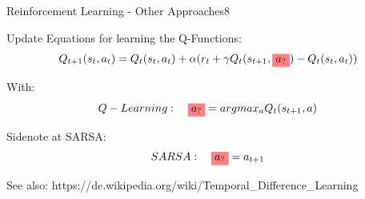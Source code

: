 \begin{questions}
\begin{question}[bonus]{Reinforcement Learning - Other Approaches}{8}
\begin{answer}
Update Equations for learning the Q-Functions:
\begin{equation}
Q_{t+1}(s_t,a_t)=Q_t(s_t,a_t)+\alpha ( r_t+\gamma Q_t(s_{t+1}, \highlight{a_?})-Q_t(s_t,a_t) )
\end{equation}

With:
\begin{equation}
	Q-Learning: \quad \highlight{a_?}=argmax_a Q_t(s_{t+1}, a)
\end{equation}

Sidenote at SARSA:
\begin{equation}
	SARSA: \quad \highlight{a_?}=a_{t+1}
\end{equation}

See also: https://de.wikipedia.org/wiki/Temporal\_Difference\_Learning
\end{answer}
\end{question}


\end{questions}
